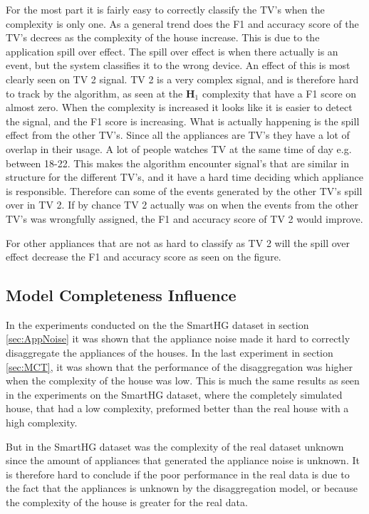 For the most part it is fairly easy to correctly classify the TV's when the complexity is only one. As a general trend does the F1 and accuracy score of the TV's decrees as the complexity of the house increase. This is due to the application spill over effect. The spill over effect is when there actually is an event, but the system classifies it to the wrong device.  An effect of this is most clearly seen on TV 2 signal. TV 2 is a very complex signal, and is therefore hard to track by the algorithm, as seen at the $\textbf{H}_1$ complexity that have a F1 score on almost zero. When the complexity is increased it looks like it is easier to detect the signal, and the F1 score is increasing. What is actually happening is the spill effect from the other TV's. Since all the appliances are TV's they have a lot of overlap in their usage. A lot of people watches TV at the same time of day e.g. between 18-22. This makes the algorithm encounter signal's that are similar in structure for the different TV's, and it have a hard time deciding which appliance is responsible. Therefore can some of the events generated by the other TV's spill over in TV 2. If by chance TV 2 actually was on when the events from the other TV's was wrongfully assigned, the F1 and accuracy score of TV 2 would improve. 

For other appliances that are not as hard to classify as TV 2 will the spill over effect decrease the F1 and accuracy score as seen on the figure. 

\subsection{Model Completeness Influence }
In the experiments conducted on the the SmartHG dataset in section \ref{sec:AppNoise} it was shown that the appliance noise made it hard to correctly disaggregate the appliances of the houses. In the last experiment in section \ref{sec:MCT}, it was shown that the performance of the disaggregation was higher when the complexity of the house was low. This is much the same results as seen in the experiments on the SmartHG dataset, where the completely simulated house, that had a low complexity, preformed better than the real house with a high complexity. 

But in the SmartHG dataset was the complexity of the real dataset unknown since the amount of appliances that generated the appliance noise is unknown. It is therefore hard to conclude if the poor performance in the real data is due to the fact that the appliances is unknown by the disaggregation model, or because the complexity of the house is greater for the real data. 

